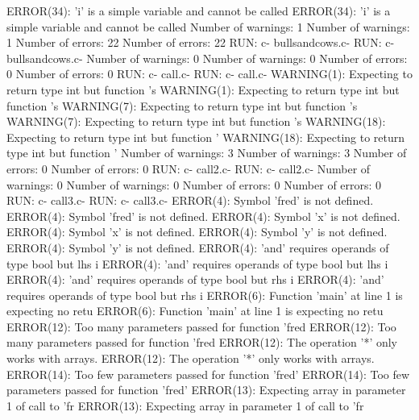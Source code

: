 \documentclass[12pt]{book}
\begin{document}
ERROR(34): 'i' is a simple variable and cannot be called        ERROR(34): 'i' is a simple variable and cannot be called
Number of warnings: 1                                                Number of warnings: 1
Number of errors: 22                                                Number of errors: 22
RUN: c- bullsandcows.c-                                                RUN: c- bullsandcows.c-
Number of warnings: 0                                                Number of warnings: 0
Number of errors: 0                                                Number of errors: 0
RUN: c- call.c-                                                        RUN: c- call.c-
WARNING(1): Expecting to return type int but function 's        WARNING(1): Expecting to return type int but function 's
WARNING(7): Expecting to return type int but function 's        WARNING(7): Expecting to return type int but function 's
WARNING(18): Expecting to return type int but function '        WARNING(18): Expecting to return type int but function '
Number of warnings: 3                                                Number of warnings: 3
Number of errors: 0                                                Number of errors: 0
RUN: c- call2.c-                                                RUN: c- call2.c-
Number of warnings: 0                                                Number of warnings: 0
Number of errors: 0                                                Number of errors: 0
RUN: c- call3.c-                                                RUN: c- call3.c-
ERROR(4): Symbol 'fred' is not defined.                                ERROR(4): Symbol 'fred' is not defined.
ERROR(4): Symbol 'x' is not defined.                                ERROR(4): Symbol 'x' is not defined.
ERROR(4): Symbol 'y' is not defined.                                ERROR(4): Symbol 'y' is not defined.
ERROR(4): 'and' requires operands of type bool but lhs i        ERROR(4): 'and' requires operands of type bool but lhs i
ERROR(4): 'and' requires operands of type bool but rhs i        ERROR(4): 'and' requires operands of type bool but rhs i
ERROR(6): Function 'main' at line 1 is expecting no retu        ERROR(6): Function 'main' at line 1 is expecting no retu
ERROR(12): Too many parameters passed for function 'fred        ERROR(12): Too many parameters passed for function 'fred
ERROR(12): The operation '*' only works with arrays.                ERROR(12): The operation '*' only works with arrays.
ERROR(14): Too few parameters passed for function 'fred'        ERROR(14): Too few parameters passed for function 'fred'
ERROR(13): Expecting array in parameter 1 of call to 'fr        ERROR(13): Expecting array in parameter 1 of call to 'fr
\end{document}
